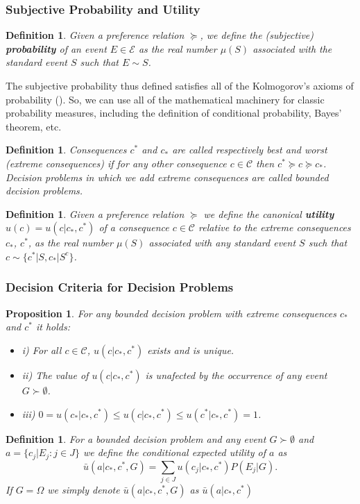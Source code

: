\documentclass[11pt]{article}
\theoremstyle{plain}
\newtheorem{prop}[teo]{Proposition}
\newtheorem{defi}[teo]{Definition}
\begin{document}
	\subsubsection{Subjective Probability and Utility}
	\begin{defi}
	Given a preference relation $\succeq$, we define the (subjective) \textbf{probability} of an event $E \in \mathcal{E}$ as the real number $\mu(S)$ associated with the standard event $S$ such that $E \sim S$.
	\end{defi}
	The subjective probability thus defined satisfies all of the Kolmogorov's axioms of probability (\cite{bernardo2000bayesian}). So, we can use all of the mathematical machinery for classic probability measures, including the definition of conditional probability, Bayes' theorem, etc.
	\begin{defi}
	Consequences $c^\ast$ and $c_\ast$ are called respectively best and worst (extreme consequences) if for any other consequence $c \in \mathcal{C}$ then $c^\ast \succeq c \succeq c_\ast$. Decision problems in which we add extreme consequences are called bounded decision problems.
	\end{defi}
	\begin{defi}
	Given a preference relation $\succeq$ we define the canonical \textbf{utility} $u(c)=u(c | c_\ast, c^\ast)$ of a consequence $c \in \mathcal{C}$ relative to the extreme consequences $c_\ast$, $c^\ast$, as the real number $\mu(S)$ associated with any standard event $S$ such that $c \sim \{c^\ast | S, c_\ast | S^c\}$.
	\end{defi}
	\subsubsection{Decision Criteria for Decision Problems}
	\begin{prop}
	For any bounded decision problem with extreme consequences $c_\ast$ and $c^\ast$ it holds:
	\begin{itemize}
	\item i) For all $c \in \mathcal{C}$, $u(c | c_\ast, c^\ast)$ exists and is unique.
	\item ii) The value of $u(c | c_\ast, c^\ast)$ is unafected by the occurrence of any event $G \succ \emptyset$.
	\item iii) $0 = u(c_\ast | c_\ast, c^\ast) \leq u(c | c_\ast, c^\ast) \leq u(c^\ast | c_\ast, c^\ast) = 1$.
	\end{itemize}
	\end{prop}
	\begin{defi}
	For a bounded decision problem and any event $G \succ \emptyset$ and $a = \{ c_j | E_j : j \in J \}$ we define the conditional expected utility of $a$ as
	\[ \bar{u}(a | c_\ast, c^\ast, G) = \sum_{j \in J} u(c_j | c_\ast, c^\ast)P(E_j | G). \]
	If $G = \Omega$ we simply denote $\bar{u}(a | c_\ast, c^\ast, G)$ as $\bar{u}(a | c_\ast, c^\ast)$
	\end{defi}
	
\end{document}
